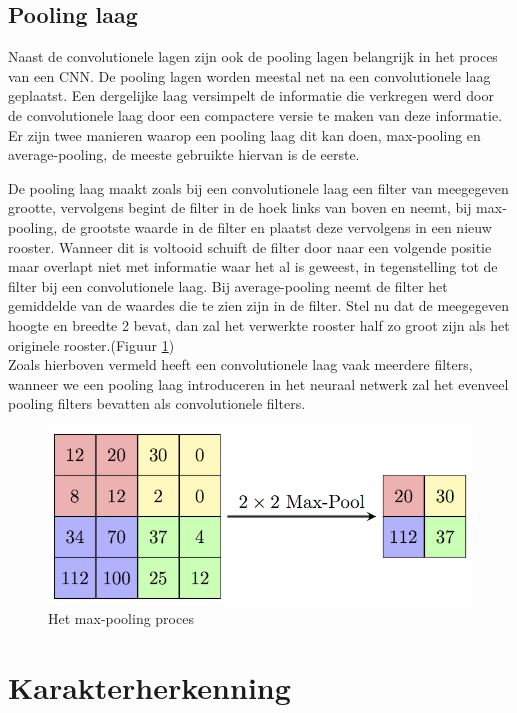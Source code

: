 \subsection{Pooling laag}

Naast de convolutionele lagen zijn ook de pooling lagen belangrijk in het proces van een CNN.
De pooling lagen worden meestal net na een convolutionele laag geplaatst. Een dergelijke laag versimpelt de informatie die verkregen werd door de convolutionele laag door een compactere versie te maken van deze informatie.
Er zijn twee manieren waarop een pooling laag dit kan doen, max-pooling en average-pooling, de meeste gebruikte hiervan is de eerste.

De pooling laag maakt zoals bij een convolutionele laag een filter van meegegeven grootte, vervolgens begint de filter in de hoek links van boven en neemt, bij max-pooling, de grootste waarde in de filter en plaatst deze vervolgens in een nieuw rooster. Wanneer dit is voltooid schuift de filter door naar een volgende positie maar overlapt niet met informatie waar het al is geweest, in tegenstelling tot de filter bij een convolutionele laag.
Bij average-pooling neemt de filter het gemiddelde van de waardes die te zien zijn in de filter.
Stel nu dat de meegegeven hoogte en breedte 2 bevat, dan zal het verwerkte rooster half zo groot zijn als het originele rooster.(Figuur \ref{tab:pooling})\\
Zoals hierboven vermeld heeft een convolutionele laag vaak meerdere filters, wanneer we een pooling laag introduceren in het neuraal netwerk zal het evenveel pooling filters bevatten als convolutionele filters.

\begin{figure}
	
	
	\includegraphics[width=\linewidth]{img/pooling.png}
	\caption{Het max-pooling proces}
	\label{tab:pooling}
\end{figure}

\section{Karakterherkenning}

